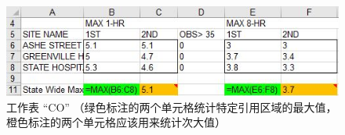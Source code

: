 \begin{figure}[tbp]
    \centering
    \includegraphics[width = .95\columnwidth]{figure/figure9.jpg}
    \caption{工作表 ``CO'' （绿色标注的两个单元格统计特定引用区域的最大值，橙色标注的两个单元格应该用来统计次大值）}
    \label{figure9}
\end{figure}